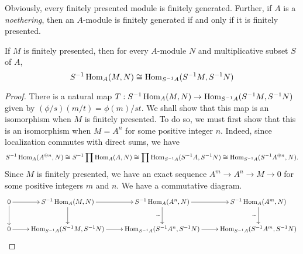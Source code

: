 Obviously, every finitely presented module is finitely generated. Further, if $A$ is a \textit{noethering}, then an $A$-module is finitely generated if and only if it is finitely presented.

\begin{proposition}
    If $M$ is finitely presented, then for every $A$-module $N$ and multiplicative subset $S$ of $A$, 
    \begin{equation*}
        S^{-1}\operatorname{Hom}_A(M,N)\cong\operatorname{Hom}_{S^{-1}A}(S^{-1}M,S^{-1}N)
    \end{equation*}
\end{proposition}
\begin{proof}
    There is a natural map $T:S^{-1}\operatorname{Hom}_A(M,N)\to\operatorname{Hom}_{S^{-1}A}(S^{-1}M,S^{-1}N)$ given by $(\phi/s)(m/t) = \phi(m)/st$. We shall show that this map is an isomorphism when $M$ is finitely presented. To do so, we must first show that this is an isomorphism when $M = A^n$ for some positive integer $n$. Indeed, since localization commutes with direct sums, we have 
    \begin{equation*}
        S^{-1}\operatorname{Hom}_A(A^{\oplus n}, N)\cong S^{-1}\prod\operatorname{Hom}_A(A,N)\cong\prod\operatorname{Hom}_{S^{-1}A}(S^{-1}A, S^{-1}N)\cong\operatorname{Hom}_{S^{-1}A}(S^{-1}A^{\oplus n}, N).
    \end{equation*}
    Since $M$ is finitely presented, we have an exact sequence $A^m\rightarrow A^n\rightarrow M\rightarrow 0$ for some positive integers $m$ and $n$. We have a commutative diagram. 
    \begin{equation*}
        \xymatrix{
            0\ar[r]\ar[d] & S^{-1}\Hom_A(M,N)\ar[r]\ar[d] & S^{-1}\Hom_A(A^n, N)\ar[r]\ar[d]_\sim & S^{-1}\Hom_A(A^m,N)\ar[d]_\sim\\
            0\ar[r] & \Hom_{S^{-1}A}(S^{-1}M,S^{-1}N)\ar[r] & \Hom_{S^{-1}A}(S^{-1}A^n, S^{-1}N)\ar[r] & \Hom_{S^{-1}A}(S^{-1}A^m,S^{-1}N)\\
        }
    \end{equation*}
\end{proof}